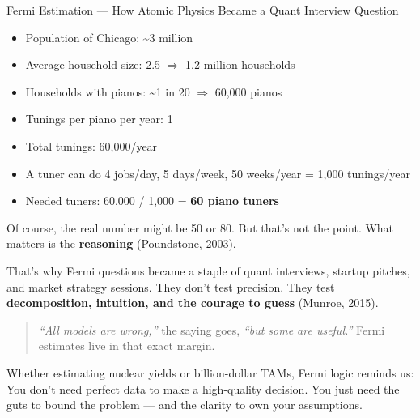 \begin{HistoricalSidebar}{Fermi Estimation --- How Atomic Physics Became a Quant Interview Question}
    \begin{itemize}
      \item Population of Chicago: \textasciitilde3 million  
      \item Average household size: 2.5 $\Rightarrow$ 1.2 million households  
      \item Households with pianos: \textasciitilde1 in 20 $\Rightarrow$ 60,000 pianos  
      \item Tunings per piano per year: 1  
      \item Total tunings: 60,000/year  
      \item A tuner can do 4 jobs/day, 5 days/week, 50 weeks/year = 1,000 tunings/year  
      \item Needed tuners: 60,000 / 1,000 = \textbf{60 piano tuners}
    \end{itemize}
  
    \medskip
  
    Of course, the real number might be 50 or 80. But that’s not the point.  
    What matters is the \textbf{reasoning} (Poundstone, 2003).
  
    \medskip
  
    That’s why Fermi questions became a staple of quant interviews, startup pitches, and market strategy sessions.  
    They don’t test precision.  
    They test \textbf{decomposition, intuition, and the courage to guess} (Munroe, 2015).
  
    \begin{quote}
    \textit{“All models are wrong,”} the saying goes, \textit{“but some are useful.”}  
    Fermi estimates live in that exact margin.
    \end{quote}
  
    \medskip
  
    Whether estimating nuclear yields or billion-dollar TAMs, Fermi logic reminds us:  
    You don’t need perfect data to make a high-quality decision.  
    You just need the guts to bound the problem — and the clarity to own your assumptions.
  
\end{HistoricalSidebar}
  
  
